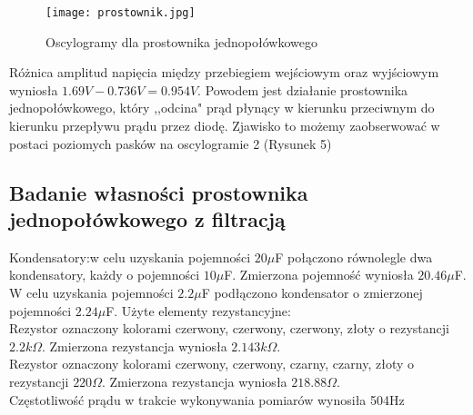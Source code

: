 \documentclass[polish,a4paper]{article}
\begin{document}
\begin{figure}[H]
\centering
\texttt{[image: prostownik.jpg]}
\caption{Oscylogramy dla prostownika jednopołówkowego}
\end{figure}

Różnica amplitud napięcia między przebiegiem wejściowym oraz wyjściowym wyniosła $1.69V - 0.736V =  0.954V$. Powodem jest działanie prostownika jednopołówkowego, który ,,odcina" prąd płynący w kierunku przeciwnym do kierunku przepływu prądu przez diodę. Zjawisko to możemy zaobserwować w postaci poziomych pasków na oscylogramie 2 (Rysunek 5) 

\subsection{Badanie własności prostownika jednopołówkowego z filtracją}

Kondensatory:w celu uzyskania pojemności $20\mu$F połączono równolegle dwa kondensatory, każdy o pojemności $10\mu$F. Zmierzona pojemność wyniosła $20.46\mu$F. W celu uzyskania pojemności $2.2\mu$F podłączono kondensator o zmierzonej pojemności $2.24\mu$F.
\newline
Użyte elementy rezystancyjne: \\
Rezystor oznaczony kolorami czerwony, czerwony, czerwony, złoty o rezystancji $2.2k\Omega$. Zmierzona rezystancja wyniosła $2.143k\Omega$. \\
Rezystor oznaczony kolorami czerwony, czerwony, czarny, czarny, złoty o rezystancji $220\Omega$. Zmierzona rezystancja wyniosła $218.88\Omega$.\\
Częstotliwość prądu w trakcie wykonywania pomiarów wynosiła 504Hz
\end{document}
